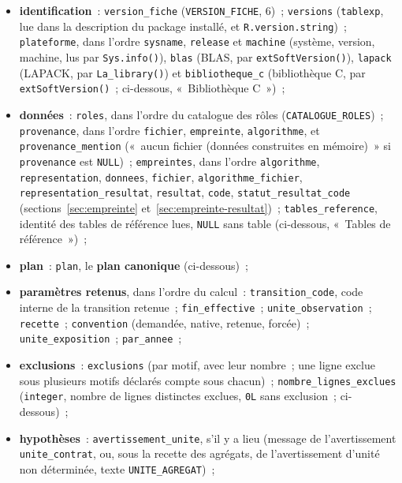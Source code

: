 \documentclass[a4paper,11pt]{article}
\newcommand{\code}[1]{\texttt{\small #1}}
\begin{document}
\begin{itemize}[leftmargin=*, itemsep=2pt]
  \item \textbf{identification}~: \code{version\_fiche}
    (\code{VERSION\_FICHE}, 6)~; \code{versions}
    (\code{tablexp}, lue dans la description du package installé, et
    \code{R.version.string})~; \code{plateforme}, dans l'ordre
    \code{sysname}, \code{release} et \code{machine} (système, version,
    machine, lus par \code{Sys.info()}), \code{blas} (BLAS, par
    \code{extSoftVersion()}), \code{lapack} (LAPACK, par
    \code{La\_library()}) et \code{bibliotheque\_c} (bibliothèque C, par
    \code{extSoftVersion()}~; ci-dessous, «~Bibliothèque C~»)~;
  \item \textbf{données}~: \code{roles}, dans l'ordre du catalogue des rôles
    (\code{CATALOGUE\_ROLES})~; \code{provenance}, dans l'ordre
    \code{fichier}, \code{empreinte}, \code{algorithme}, et
    \code{provenance\_mention} («~aucun fichier (données construites en
    mémoire)~» si \code{provenance} est \code{NULL})~; \code{empreintes},
    dans l'ordre \code{algorithme}, \code{representation}, \code{donnees},
    \code{fichier}, \code{algorithme\_fichier},
    \code{representation\_resultat}, \code{resultat}, \code{code},
    \code{statut\_resultat\_code} (sections~\ref{sec:empreinte}
    et~\ref{sec:empreinte-resultat})~; \code{tables\_reference}, identité des
    tables de référence lues, \code{NULL} sans table (ci-dessous, «~Tables
    de référence~»)~;
  \item \textbf{plan}~: \code{plan}, le \textbf{plan canonique}
    (ci-dessous)~;
  \item \sloppy{} \textbf{paramètres retenus}, dans l'ordre du
    calcul~: \code{transition\_code}, code interne de la transition
    retenue~; \code{fin\_effective}~; \code{unite\_observation}~;
    \code{recette}~; \code{convention} (demandée, native, retenue,
    forcée)~; \code{unite\_exposition}~; \code{par\_annee}~;
  \item \textbf{exclusions}~: \code{exclusions} (par motif, avec leur
    nombre~; une ligne exclue sous plusieurs motifs déclarés compte sous
    chacun)~; \code{nombre\_lignes\_exclues} (\code{integer}, nombre de
    lignes distinctes exclues, \code{0L} sans exclusion~; ci-dessous)~;
  \item \textbf{hypothèses}~: \code{avertissement\_unite}, s'il y a lieu
    (message de l'avertissement \code{unite\_contrat}, ou, sous la recette
    des agrégats, de l'avertissement d'unité non déterminée, texte
    \code{UNITE\_AGREGAT})~;

\end{itemize}
\end{document}
